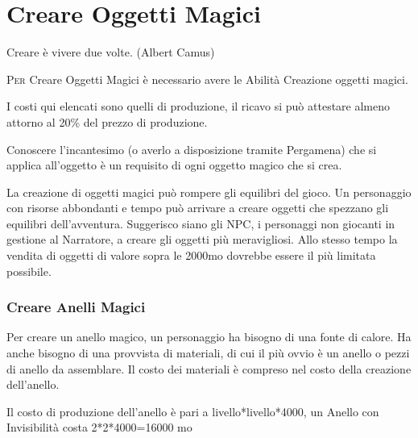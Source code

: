 \section{Creare Oggetti Magici}

\begin{changemargin}{0.3cm}{0.3cm}\begin{enfasi}{
Creare è vivere due volte. (Albert Camus)}\end{enfasi}\end{changemargin}\medskip

\begin{multicols}{2}

\label{creare-oggetti-magici}

\lettrine[lines=2, lhang=0.33, loversize=0.25, findent=1.5em]{P}{er} Creare Oggetti Magici è necessario avere le Abilità Creazione oggetti magici.

I costi qui elencati sono quelli di produzione, il ricavo si può attestare almeno attorno al 20\% del prezzo di produzione.

Conoscere l'incantesimo (o averlo a disposizione tramite Pergamena) che si applica all'oggetto è un requisito di ogni oggetto magico che si crea.

\begin{changemargin}{0.3cm}{0.3cm}\begin{narratore}
La creazione di oggetti magici può rompere gli equilibri del gioco. Un personaggio con risorse abbondanti e tempo può arrivare a creare oggetti che spezzano gli equilibri dell'avventura. Suggerisco siano gli NPC, i personaggi non giocanti in gestione al Narratore, a creare gli oggetti più meravigliosi. Allo stesso tempo la vendita di oggetti di valore sopra le 2000mo dovrebbe essere il più limitata possibile.
\end{narratore}\end{changemargin}

\subsubsection{Creare Anelli Magici}

Per creare un anello magico, un personaggio ha bisogno di una fonte di calore. Ha anche bisogno di una provvista di materiali, di cui il più ovvio è un anello o pezzi di anello da assemblare. Il costo dei materiali è compreso nel costo della creazione dell'anello.

Il costo di produzione dell'anello è pari a livello*livello*4000, un Anello con Invisibilità costa 2*2*4000=16000 mo


\end{multicols}
